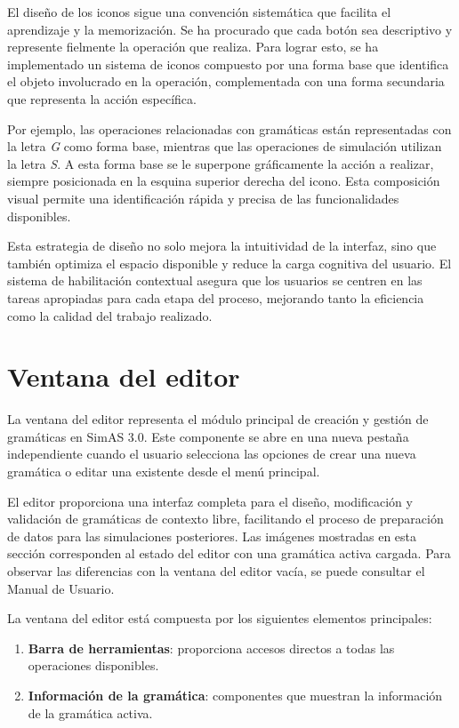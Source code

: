 El diseño de los iconos sigue una convención sistemática que facilita el aprendizaje y la memorización. Se ha procurado que cada botón sea descriptivo y represente fielmente la operación que realiza. Para lograr esto, se ha implementado un sistema de iconos compuesto por una forma base que identifica el objeto involucrado en la operación, complementada con una forma secundaria que representa la acción específica.

Por ejemplo, las operaciones relacionadas con gramáticas están representadas con la letra \textit{G} como forma base, mientras que las operaciones de simulación utilizan la letra \textit{S}. A esta forma base se le superpone gráficamente la acción a realizar, siempre posicionada en la esquina superior derecha del icono. Esta composición visual permite una identificación rápida y precisa de las funcionalidades disponibles.

Esta estrategia de diseño no solo mejora la intuitividad de la interfaz, sino que también optimiza el espacio disponible y reduce la carga cognitiva del usuario. El sistema de habilitación contextual asegura que los usuarios se centren en las tareas apropiadas para cada etapa del proceso, mejorando tanto la eficiencia como la calidad del trabajo realizado.
  

\section{Ventana del editor}

La ventana del editor representa el módulo principal de creación y gestión de gramáticas en SimAS 3.0. Este componente se abre en una nueva pestaña independiente cuando el usuario selecciona las opciones de crear una nueva gramática o editar una existente desde el menú principal.

El editor proporciona una interfaz completa para el diseño, modificación y validación de gramáticas de contexto libre, facilitando el proceso de preparación de datos para las simulaciones posteriores. Las imágenes mostradas en esta sección corresponden al estado del editor con una gramática activa cargada. Para observar las diferencias con la ventana del editor vacía, se puede consultar el Manual de Usuario.

La ventana del editor está compuesta por los siguientes elementos principales:
\begin{enumerate}
 \item \textbf{Barra de herramientas}: proporciona accesos directos a todas las operaciones disponibles.
 \item \textbf{Información de la gramática}: componentes que muestran la información de la gramática activa.
\end{enumerate}

